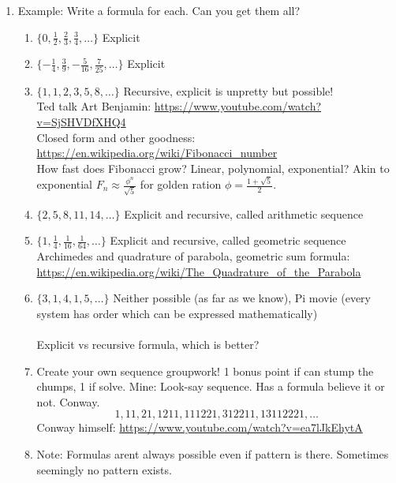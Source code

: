 \documentclass{article}
\begin{document}
\begin{enumerate}
\item Example: Write a formula for each. Can you get them all?
\begin{enumerate}
\item $\{0, \frac{1}{2}, \frac{2}{3}, \frac{3}{4}, \dots\}$ Explicit
\item $\{-\frac{1}{4}, \frac{3}{9}, -\frac{5}{16}, \frac{7}{25}, \dots\}$ Explicit
\item $\{1, 1, 2, 3, 5, 8, \dots\}$ Recursive, explicit is unpretty but possible! \\
Ted talk Art Benjamin: \url{https://www.youtube.com/watch?v=SjSHVDfXHQ4} \\
Closed form and other goodness: \url{https://en.wikipedia.org/wiki/Fibonacci_number} \\
How fast does Fibonacci grow? Linear, polynomial, exponential? Akin to exponential $F_n \approx \frac{\phi^n}{\sqrt{5}}$ for golden ration $\phi = \frac{1+\sqrt{5}}{2}$.
\item $\{2, 5, 8, 11, 14, \dots\}$ Explicit and recursive, called arithmetic sequence
\item $\{1, \frac{1}{4}, \frac{1}{16}, \frac{1}{64}, \dots\}$ Explicit and recursive, called geometric sequence \\
Archimedes and quadrature of parabola,  geometric sum formula: \url{https://en.wikipedia.org/wiki/The_Quadrature_of_the_Parabola}
\item $\{3, 1, 4, 1, 5, \dots\}$ Neither possible (as far as we know), Pi movie (every system has order which can be expressed mathematically) \\ \ \\
Explicit vs recursive formula, which is better?
\item Create your own sequence groupwork! 1 bonus point if can stump the chumps, 1 if solve. Mine: Look-say sequence. Has a formula believe it or not. Conway.
\[
1, 11, 21, 1211, 111221, 312211, 13112221, \dots
\]
Conway himself: \url{https://www.youtube.com/watch?v=ea7lJkEhytA}
\item Note: Formulas arent always possible even if pattern is there. Sometimes seemingly no pattern exists.
\end{enumerate}


\end{enumerate}
\end{document}

